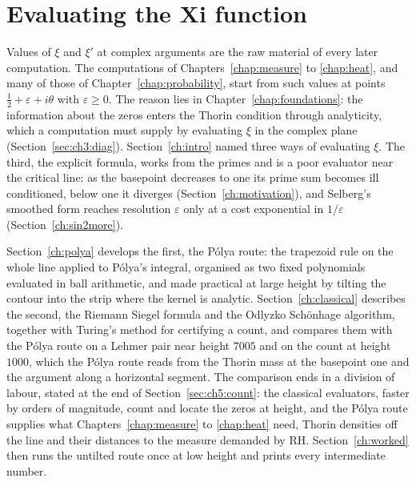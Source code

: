 \chapter{Evaluating the Xi function}\label{chap:evaluation}

Values of $\xi$ and $\xi'$ at complex arguments are the raw material of every later computation. The computations of Chapters~\ref{chap:measure} to \ref{chap:heat}, and many of those of Chapter~\ref{chap:probability}, start from such values at points $\tfrac12+\varepsilon+i\theta$ with $\varepsilon\ge0$. The reason lies in Chapter~\ref{chap:foundations}: the information about the zeros enters the Thorin condition through analyticity, which a computation must supply by evaluating $\xi$ in the complex plane (Section~\ref{sec:ch3:diag}). Section~\ref{ch:intro} named three ways of evaluating $\xi$. The third, the explicit formula, works from the primes and is a poor evaluator near the critical line: as the basepoint decreases to one its prime sum becomes ill conditioned, below one it diverges (Section~\ref{ch:motivation}), and Selberg's smoothed form reaches resolution $\varepsilon$ only at a cost exponential in $1/\varepsilon$ (Section~\ref{ch:sin2more}).

Section~\ref{ch:polya} develops the first, the P\'olya route: the trapezoid rule on the whole line applied to P\'olya's integral, organised as two fixed polynomials evaluated in ball arithmetic, and made practical at large height by tilting the contour into the strip where the kernel is analytic. Section~\ref{ch:classical} describes the second, the Riemann Siegel formula and the Odlyzko Sch\"onhage algorithm, together with Turing's method for certifying a count, and compares them with the P\'olya route on a Lehmer pair near height $7005$ and on the count at height $1000$, which the P\'olya route reads from the Thorin mass at the basepoint one and the argument along a horizontal segment. The comparison ends in a division of labour, stated at the end of Section~\ref{sec:ch5:count}: the classical evaluators, faster by orders of magnitude, count and locate the zeros at height, and the P\'olya route supplies what Chapters~\ref{chap:measure} to \ref{chap:heat} need, Thorin densities off the line and their distances to the measure demanded by RH. Section~\ref{ch:worked} then runs the untilted route once at low height and prints every intermediate number.

